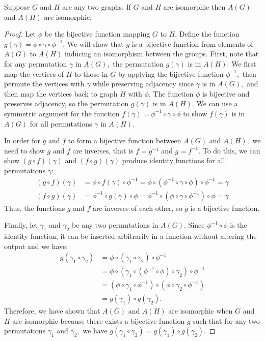 \documentclass{article}
\begin{document}
\begin{lemma}\label{lem:cong}
    Suppose $G$ and $H$ are any two graphs. If $G$ and $H$ are isomorphic then $A(G)$ and $A(H)$ are isomorphic.
\end{lemma}
\begin{proof}
    Let $\phi$ be the bijective function mapping $G$ to $H.$ Define the function $g(\gamma) = \phi \circ \gamma \circ \phi^{-1}.$ We will show that $g$ is a bijective function from elements of $A(G)$ to $A(H)$ inducing an isomorphism between the groups. First, note that for any permutation $\gamma$ in $A(G),$ the permutation $g(\gamma)$ is in $A(H).$ We first map the vertices of $H$ to those in $G$ by applying the bijective function $\phi^{-1},$ then permute the vertices with $\gamma$ while preserving adjacency since $\gamma$ is in $A(G),$ and then map the vertices back to graph $H$ with $\phi.$ The function $\phi$ is bijective and preserves adjacency, so the permutation $g(\gamma)$ is in $A(H).$ We can use a symmetric argument for the function $f(\gamma) = \phi^{-1}\circ \gamma \circ \phi$ to show $f(\gamma)$ is in $A(G)$ for all permutations $\gamma$ in $A(H).$ 
    
    In order for $g$ and $f$ to form a bijective function between $A(G)$ and $A(H),$ we need to show $g$ and $f$ are inverses, that is $f = g^{-1}$ and $g = f^{-1}.$ To do this, we can show $(g \circ f) (\gamma)$ and $(f \circ g) (\gamma)$ produce identity functions for all permutations $\gamma:$
    \begin{align*}
        (g \circ f) (\gamma) &= \phi \circ f(\gamma) \circ \phi^{-1} = \phi \circ (\phi^{-1} \circ \gamma \circ \phi) \circ \phi^{-1} = \gamma\\
        (f \circ g) (\gamma) &= \phi^{-1}\circ g(\gamma) \circ \phi = \phi^{-1} \circ (\phi \circ \gamma \circ \phi^{-1}) \circ \phi = \gamma
    \end{align*}
    Thus, the functions $g$ and $f$ are inverses of each other, so $g$ is a bijective function.

    
    Finally, let $\gamma_1$ and $\gamma_2$ be any two permutations in $A(G).$ Since $\phi^{-1} \circ \phi$ is the identity function, it can be inserted arbitrarily in a function without altering the output and we have:
    \begin{align*}
        g(\gamma_1 \circ \gamma_2) &= \phi \circ (\gamma_1 \circ \gamma_2) \circ \phi^{-1}\\
        &= \phi \circ (\gamma_1 \circ (\phi^{-1} \circ \phi) \circ \gamma_2) \circ \phi^{-1}\\
        &= (\phi \circ \gamma_1 \circ \phi^{-1}) \circ (\phi \circ \gamma_2 \circ \phi^{-1})\\
        &= g(\gamma_1) \circ g(\gamma_2).
    \end{align*}
    Therefore, we have shown that $A(G)$ and $A(H)$ are isomorphic when $G$ and $H$ are isomorphic because there exists a bijective function $g$ such that for any two permutations $\gamma_1$ and $\gamma_2,$ we have $g(\gamma_1 \circ \gamma_2) = g(\gamma_1) \circ g(\gamma_2).$
\end{proof}
\end{document}
